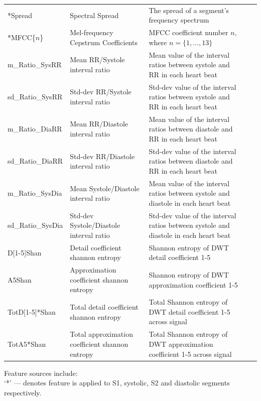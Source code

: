 \documentclass[titlepage, 12pt]{scrartcl} \usepackage{enumitem}
\begin{document}
\begin{table}[H]
\begin{tabulary}{\linewidth}{LLLLL}
*Spread                    & Spectral Spread                                 & The spread of a segment's frequency spectrum                                         \\
*MFCC\{$n$\} & Mel-frequency Cepstrum Coefficients             & MFCC coefficient number $n$, where $n = \{1, \ldots, 13\}$                           \\
m\_Ratio\_SysRR            & Mean RR/Systole interval ratio                  & Mean value of the interval ratios between systole and RR in each heart beat          \\
sd\_Ratio\_SysRR           & Std-dev RR/Systole interval ratio               & Std-dev value of the interval ratios between systole and RR in each heart beat       \\
m\_Ratio\_DiaRR            & Mean RR/Diastole interval ratio                 & Mean value of the interval ratios between diastole and RR in each heart beat         \\
sd\_Ratio\_DiaRR           & Std-dev RR/Diastole interval ratio              & Std-dev value of the interval ratios between diastole and RR in each heart beat      \\
m\_Ratio\_SysDia           & Mean Systole/Diastole interval ratio            & Mean value of the interval ratios between systole and diastole in each heart beat    \\
sd\_Ratio\_SysDia          & Std-dev Systole/Diastole interval ratio         & Std-dev value of the interval ratios between systole and diastole in each heart beat \\
D[1-5]Shan             & Detail coefficient shannon entropy              & Shannon entropy of DWT detail coefficient 1-5                                        \\
A5Shan                     & Approximation coefficient shannon entropy       & Shannon entropy of DWT approximation coefficient 1-5                                 \\
\mbox{TotD[1-5]*Shan}         & Total detail coefficient shannon entropy        & Total Shannon entropy of DWT detail coefficient 1-5 across signal                    \\
TotA5*Shan                 & Total approximation coefficient shannon entropy & Total Shannon entropy of DWT approximation coefficient 1-5 across signal             \\ \hline
\end{tabulary}
\justifying
\scriptsize
Feature sources include:~\parencite{Homsi2016, Schmidt2015, Liang1998,
Lerch2012}\\
`*' --- denotes feature is applied to S1, systolic, S2 and diastolic segments
respectively.
\end{table}
\pagebreak
\end{document}
